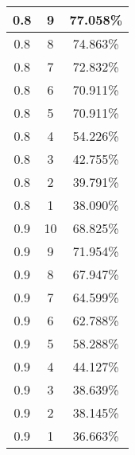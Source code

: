 \begin{center}
\begin{longtable}{|c | c | c|}
\hline
0.8 & 9 & 77.058\% \\
\hline
0.8 & 8 & 74.863\% \\
\hline
0.8 & 7 & 72.832\% \\
\hline
0.8 & 6 & 70.911\% \\
\hline
0.8 & 5 & 70.911\% \\
\hline
0.8 & 4 & 54.226\% \\
\hline
0.8 & 3 & 42.755\% \\
\hline
0.8 & 2 & 39.791\% \\
\hline
0.8 & 1 & 38.090\% \\
\hline
\hline
0.9 & 10 & 68.825\% \\
\hline
0.9 & 9 & 71.954\% \\
\hline
0.9 & 8 & 67.947\% \\
\hline
0.9 & 7 & 64.599\% \\
\hline
0.9 & 6 & 62.788\% \\
\hline
0.9 & 5 & 58.288\% \\
\hline
0.9 & 4 & 44.127\% \\
\hline
0.9 & 3 & 38.639\% \\
\hline
0.9 & 2 & 38.145\% \\
\hline
0.9 & 1 & 36.663\% \\
\hline
\hline
\end{longtable}
\end{center}
